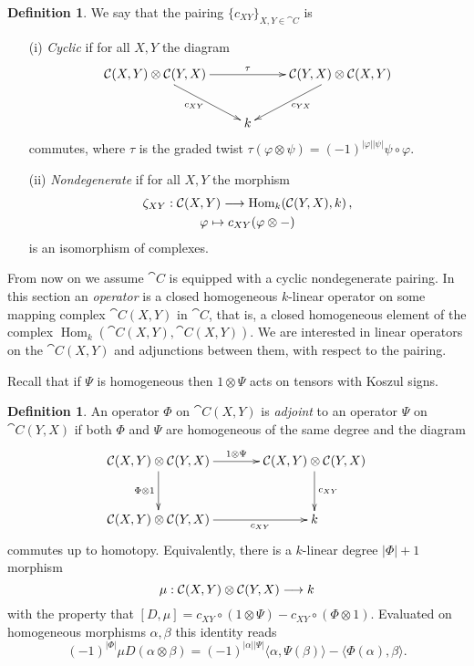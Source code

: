 \documentclass{compositio}
\theoremstyle{definition}
\newtheorem{definition}[theorem]{Definition}
\newtheorem{remark}[theorem]{Remark}
\numberwithin{equation}{section}
\def\Hom{\operatorname{Hom}}
\begin{document}
\begin{definition}\label{defn:nondegpair} We say that the pairing $\{ c_{XY} \}_{X,Y \in \cat{C}}$ is
\begin{itemize}
\item[(i)] \emph{Cyclic} if for all $X,Y$ the diagram
\[
\xymatrix{
\cat{C}(X,Y) \otimes \cat{C}(Y,X) \ar[dr]_{c_{XY}}\ar[rr]^\tau & & \cat{C}(Y,X) \otimes \cat{C}(X,Y) \ar[dl]^{c_{YX}}\\
& k
}
\]
commutes, where $\tau$ is the graded twist $\tau( \varphi \otimes \psi) = (-1)^{|\varphi||\psi|} \psi \circ \varphi$. 
\item[(ii)] \emph{Nondegenerate} if for all $X,Y$ the morphism
\begin{gather*}
\zeta_{XY}: \cat{C}(X,Y) \lto \Hom_k( \cat{C}(Y,X), k)\,,\\
\varphi \mapsto c_{XY}( \varphi \otimes - )
\end{gather*}
is an isomorphism of complexes.
\end{itemize}
\end{definition}


From now on we assume $\cat{C}$ is equipped with a cyclic nondegenerate pairing. In this section an \emph{operator} is a closed homogeneous $k$-linear operator on some mapping complex $\cat{C}(X,Y)$ in $\cat{C}$, that is, a closed homogeneous element of the complex $\Hom_k( \cat{C}(X,Y), \cat{C}(X,Y) )$. We are interested in linear operators on the $\cat{C}(X,Y)$ and adjunctions between them, with respect to the pairing.

Recall that if $\Psi$ is homogeneous then $1 \otimes \Psi$ acts on tensors with Koszul signs.

\begin{definition}\label{defn:adjointop} An operator $\Phi$ on $\cat{C}(X,Y)$ is \emph{adjoint} to an operator $\Psi$ on $\cat{C}(Y,X)$ if both $\Phi$ and $\Psi$ are homogeneous of the same degree and the diagram
\[
\xymatrix@C+1pc@R+0.5pc{
\cat{C}(X,Y) \otimes \cat{C}(Y,X) \ar[d]_{\Phi \otimes 1} \ar[r]^{1 \otimes \Psi} & \cat{C}(X,Y) \otimes \cat{C}(Y,X) \ar[d]^{c_{XY}}\\
\cat{C}(X,Y) \otimes \cat{C}(Y,X) \ar[r]_-{c_{XY}} & k
}
\]
commutes up to homotopy. Equivalently, there is a $k$-linear degree $|\Phi|+1$ morphism
\[
\mu: \mathcal{C}(X,Y) \otimes \mathcal{C}(Y,X) \longrightarrow k
\]
with the property that $[D, \mu] = c_{XY} \circ (1 \otimes \Psi) - c_{XY} \circ ( \Phi \otimes 1)$. Evaluated on homogeneous morphisms $\alpha, \beta$ this identity reads
\begin{equation}\label{eq:adjointopeq}
(-1)^{|\Phi|} \mu D(\alpha \otimes \beta) = (-1)^{|\alpha||\Psi|}\langle \alpha, \Psi(\beta) \rangle - \langle \Phi(\alpha) , \beta \rangle.
\end{equation}
\end{definition}
\end{document}
